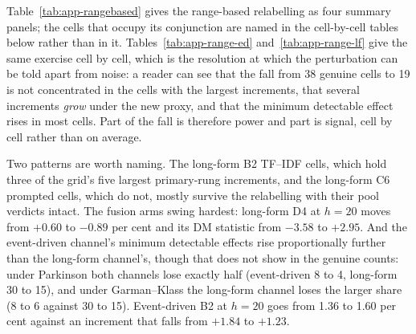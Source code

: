 Table~\ref{tab:app-rangebased} gives the range-based relabelling as four
summary panels; the cells that occupy its conjunction are named in the
cell-by-cell tables below rather than in it.
Tables~\ref{tab:app-range-ed} and~\ref{tab:app-range-lf} give the same
exercise cell by cell, which is the resolution at which the perturbation
can be told apart from noise: a reader can see that the fall from 38
genuine cells to 19 is not concentrated in the cells with the largest
increments, that several increments \emph{grow} under the new proxy, and
that the minimum detectable effect rises in most cells. Part of the
fall is therefore power and part is signal, cell by cell rather than on average.

Two patterns are worth naming. The long-form B2 TF--IDF cells, which hold
three of the grid's five largest primary-rung increments, and the long-form C6
prompted cells, which do not, mostly survive the
relabelling with their pool verdicts intact.
The fusion arms swing
hardest: long-form D4 at $h{=}20$ moves from $+0.60$ to $-0.89$ per cent
and its DM statistic from $-3.58$ to $+2.95$. And the event-driven channel's
minimum detectable effects rise proportionally further than the long-form
channel's, though that does not show in the genuine counts: under Parkinson
both channels lose exactly half (event-driven 8 to 4, long-form 30 to 15), and
under Garman--Klass the long-form channel loses the larger share (8 to 6
against 30 to 15).
Event-driven B2 at $h{=}20$ goes from 1.36 to
1.60 per cent against an increment that falls from $+1.84$ to $+1.23$.

